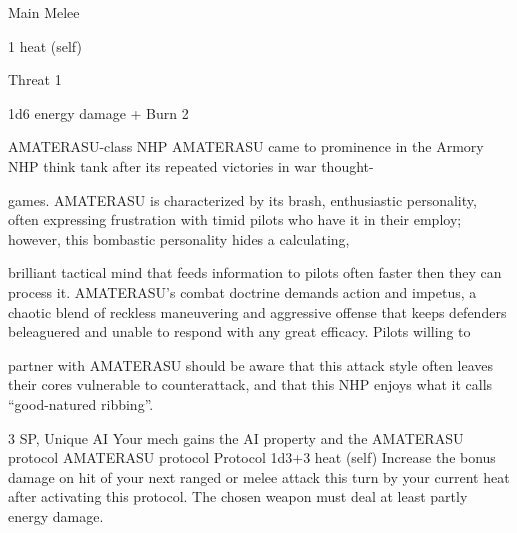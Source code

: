 Main Melee

1 heat (self)

Threat 1

1d6 energy damage + Burn 2


AMATERASU-class NHP
AMATERASU came to prominence in the Armory NHP think tank after its repeated victories in war thought-

games. AMATERASU is characterized by its brash, enthusiastic personality, often expressing frustration
with timid pilots who have it in their employ; however, this bombastic personality hides a calculating,

brilliant tactical mind that feeds information to pilots often faster then they can process it. AMATERASU’s
combat doctrine demands action and impetus, a chaotic blend of reckless maneuvering and aggressive
offense that keeps defenders beleaguered and unable to respond with any great efficacy. Pilots willing to

partner with AMATERASU should be aware that this attack style often leaves their cores vulnerable to
counterattack, and that this NHP enjoys what it calls “good-natured ribbing”.

3 SP, Unique
AI
Your mech gains the AI property and the AMATERASU protocol
	        AMATERASU protocol
	        Protocol
	        1d3+3 heat (self)
         Increase the bonus damage on hit of your next ranged or melee attack this turn by your
         current heat after activating this protocol. The chosen weapon must deal at least partly
         energy damage.
